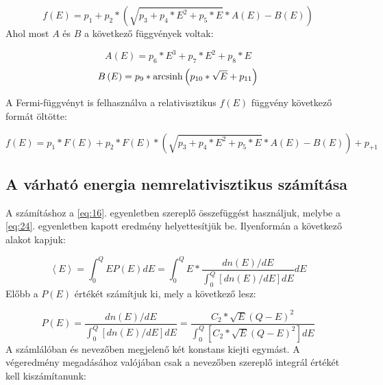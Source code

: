 \begin{equation} \label{eq:64}
\boxed{
f \left( E \right)
=
p_{1} + p_{2} * \left( \sqrt{p_{3} + p_{4} * E^{2} + p_{5} * E} * A \left( E \right) - B \left( E \right) \right)
}
\end{equation}
Ahol most $A$ és $B$ a következő függvények voltak:

\begin{equation} \label{eq:65}
A \left( E \right)
=
p_{6} * E^{3} + p_{7} * E^{2} + p_{8} * E
\end{equation}
\begin{equation} \label{eq:66}
B \left( E \right)
=
p_{9} * \operatorname{arcsinh} \left(p_{10} * \sqrt{E} + p_{11} \right)
\end{equation}

A Fermi-függvényt is felhasználva a relativisztikus $f \left( E \right)$ függvény következő formát öltötte:

\begin{equation} \label{eq:67}
\boxed{
f \left( E \right)
=
p_{1} * F \left( E \right) + p_{2} * F \left( E \right) * \left( \sqrt{p_{3} + p_{4} * E^{2} + p_{5} * E} * A \left( E \right) - B \left( E \right) \right) + p_{+1}
}
\end{equation}

\subsection{A várható energia nemrelativisztikus számítása}

A számításhoz a \ref{eq:16}. egyenletben szereplő összefüggést használjuk, melybe a \ref{eq:24}. egyenletben kapott eredmény helyettesítjük be. Ilyenformán a következő alakot kapjuk:

\begin{equation} \label{eq:68}
\left< E \right>
=
\int_{0}^{Q} E P \left( E \right) dE
=
\int_{0}^{Q} E * \frac{dn \left( E \right) / dE}{\int_{0}^{Q} \left[ dn \left( E \right) / dE \right] dE} dE
\end{equation}
Előbb a $P \left( E \right)$ értékét számítjuk ki, mely a következő lesz:

\begin{equation} \label{eq:69}
P \left( E \right)
=
\frac{dn \left( E \right) / dE}{\int_{0}^{Q} \left[ dn \left( E \right) / dE \right] dE}
=
\frac{C_{2} * \sqrt{E} \left( Q - E \right)^{2}}{\int_{0}^{Q} \left[ C_{2} * \sqrt{E} \left( Q - E \right)^{2} \right] dE}
\end{equation}
A számlálóban és nevezőben megjelenő két konstans kiejti egymást. A végeredmény megadásához valójában csak a nevezőben szereplő integrál értékét kell kiszámítanunk:


